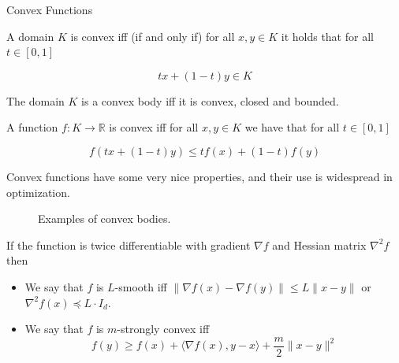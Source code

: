\documentclass[10pt]{beamer}
\begin{document}
\begin{frame}[allowframebreaks]{Convex Functions}

A domain $K$  is convex iff (if and only if) for all $x, y \in K$ it holds that for all $t \in [0, 1]$ 

$$tx + (1-t)y \in K$$

The domain $K$ is a convex body iff it is convex, closed and bounded. 

A function $f: K \to \mathbb R$ is convex iff for all $x, y \in K$ we have that for all $t \in [0, 1]$

$$
    f(tx + (1-t)y) \le t f(x) + (1-t) f(y)
$$

Convex functions have some very nice properties, and their use is widespread in optimization.  
    
\framebreak    
    

\begin{figure}[t]
    \centering
     \qquad
    \caption{Examples of convex bodies.}
    \label{fig:examples}
\end{figure}
    
    
\framebreak    
    
If the function is twice differentiable with gradient $\nabla f$ and Hessian matrix $\nabla^2 f$ then
\begin{itemize}
    \item We say that $f$ is $L$-smooth iff $\| \nabla f(x) - \nabla f(y) \| \le L \| x - y \|$ or $\nabla^2 f(x) \preceq L \cdot I_d$.
    \item We say that $f$ is $m$-strongly convex iff 
    $$f(y) \ge f(x) + \langle \nabla f(x), y - x \rangle + \frac m 2 \| x - y \|^2 $$
    

\end{itemize}
\end{frame}
\end{document}
